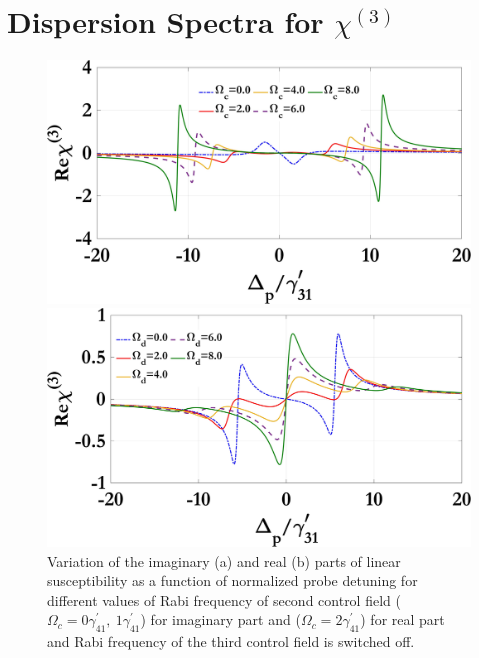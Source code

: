 \documentclass[12pt,a4paper]{article}
\begin{document}
\section{Dispersion Spectra for \(\chi^{(3)}\) }

\begin{figure}[h]
  \centering
  \begin{minipage}{0.48\textwidth}
    \centering
    \includegraphics[width=\linewidth]{Plots/Real_chi3_Omega_c.jpeg}
    \subcaption{}
  \end{minipage}%
  \hfill
  \begin{minipage}{0.48\textwidth}
    \centering
    \includegraphics[width=\linewidth]{Plots/Real_chi3_Omega_d.jpeg}
    \subcaption{}
  \end{minipage}
  \caption{Variation of the imaginary (a) and real (b) parts of linear susceptibility as a function of normalized probe detuning for different values of Rabi frequency of second control field ($\Omega_c=0\gamma^{\prime}_{41},\ 1\gamma^{\prime}_{41}$) for imaginary part and ($\Omega_c=2\gamma^{\prime}_{41}$) for real part and Rabi frequency of the third control field is switched off.}
  \label{fig:omegac}
\end{figure}
\end{document}
